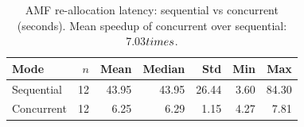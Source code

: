 \begin{table}[htbp]
\centering
\caption{AMF re-allocation latency: sequential vs concurrent (seconds). Mean speedup of concurrent over sequential: 7.03$\\times$.}
\label{tab:comparison}
\begin{tabular}{lrrrrrr}
\hline
Mode & $n$ & Mean & Median & Std & Min & Max \\
\hline
Sequential & 12 & 43.95 & 43.95 & 26.44 & 3.60 & 84.30 \\
Concurrent & 12 & 6.25 & 6.29 & 1.15 & 4.27 & 7.81 \\
\hline
\end{tabular}
\end{table}
